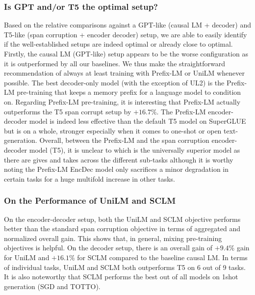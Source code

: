\documentclass[10pt]{article}
\begin{document}
\subsubsection{Is GPT and/or T5 the optimal setup?}
Based on the relative comparisons against a GPT-like (causal LM + decoder) and T5-like (span corruption + encoder decoder) setup, we are able to easily identify if the well-established setups are indeed optimal or already close to optimal. Firstly, the causal LM (GPT-like) setup appears to be the worse configuration as it is outperformed by all our baselines. We thus make the straightforward recommendation of always at least training with Prefix-LM or UniLM whenever possible. The best decoder-only model (with the exception of UL2) is the Prefix-LM pre-training that keeps a memory prefix for a language model to condition on. Regarding Prefix-LM pre-training, it is interesting that Prefix-LM actually outperforms the T5 span corrupt setup by $+16.7\%$. The Prefix-LM encoder-decoder model is indeed less effective than the default T5 model on SuperGLUE but is on a whole, stronger especially when it comes to one-shot or open text-generation. Overall, between the Prefix-LM and the span corruption encoder-decoder model (T5), it is unclear to which is the universally superior model as there are gives and takes across the different sub-tasks although it is worthy noting the Prefix-LM EncDec model only sacrifices a minor degradation in certain tasks for a huge multifold increase in other tasks. 

\subsubsection{On the Performance of UniLM and SCLM}
On the encoder-decoder setup, both the UniLM and SCLM objective performs better than the standard span corruption objective in terms of aggregated and normalized overall gain. This shows that, in general, mixing pre-training objectives is helpful. On the decoder setup, there is an overall gain of $+9.4\%$ gain for UniLM and $+16.1\%$ for SCLM compared to the baseline causal LM. In terms of individual tasks, UniLM and SCLM both outperforms T5 on 6 out of 9 tasks. It is also noteworthy that SCLM performs the best out of all models on 1shot generation (SGD and TOTTO). 
\end{document}
